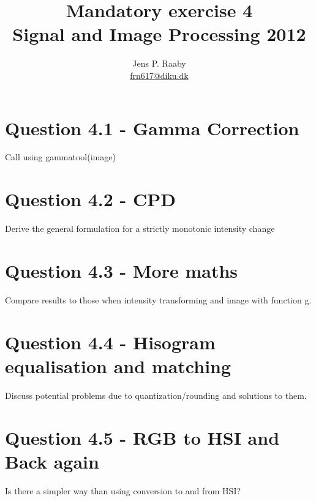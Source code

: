 \documentclass[a4paper]{article}
\title{Mandatory exercise 4 \\
Signal and Image Processing 2012}
\author{Jens P. Raaby \\
\url{frn617@diku.dk}}
\begin{document}
 
\maketitle

\section*{Question 4.1 - Gamma Correction} 
Call using gammatool(image)

\section*{Question 4.2 - CPD}
Derive the general formulation for a strictly monotonic intensity change

\section*{Question 4.3 - More maths}
Compare results to those when intensity transforming and image with function g.

\section*{Question 4.4 - Hisogram equalisation and matching}
Discuss potential problems due to quantization/rounding and solutions to them.

\section*{Question 4.5 - RGB to HSI and Back again}
Is there a simpler way than using conversion to and from HSI?
\end{document}
